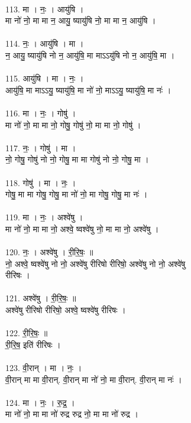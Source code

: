 \\
113. मा । नः॒ । आयु॑षि ।\\
मा नो॑ नो॒ मा मा न॒ आयु॒ ष्यायु॑षि नो॒ मा मा न॒ आयु॑षि ।\\
\\
114. नः॒ । आयु॑षि । मा ।\\
न॒ आयु॒ ष्यायु॑षि नो न॒ आयु॑षि॒ मा माऽऽयु॑षि नो न॒ आयु॑षि॒ मा ।\\
\\
115. आयु॑षि । मा । नः॒ ।\\
आयु॑षि॒ मा माऽऽयु॒ ष्यायु॑षि॒ मा नो॑ नो॒ माऽऽयु॒ ष्यायु॑षि॒ मा नः॑ ।\\
\\
116. मा । नः॒ । गोषु॑ ।\\
मा नो॑ नो॒ मा मा नो॒ गोषु॒ गोषु॑ नो॒ मा मा नो॒ गोषु॑ ।\\
\\
117. नः॒ । गोषु॑ । मा ।\\
नो॒ गोषु॒ गोषु॑ नो नो॒ गोषु॒ मा मा गोषु॑ नो नो॒ गोषु॒ मा ।\\
\\
118. गोषु॑ । मा । नः॒ ।\\
गोषु॒ मा मा गोषु॒ गोषु॒ मा नो॑ नो॒ मा गोषु॒ गोषु॒ मा नः॑ ।\\
\\
119. मा । नः॒ । अश्वे॑षु ।\\
मा नो॑ नो॒ मा मा नो॒ अश्वे॒ ष्वश्वे॑षु नो॒ मा मा नो॒ अश्वे॑षु ।\\
\\
120. नः॒ । अश्वे॑षु । री॒रि॒षः॒ ॥\\
नो॒ अश्वे॒ ष्वश्वे॑षु नो नो॒ अश्वे॑षु रीरिषो रीरिषो॒ अश्वे॑षु नो नो॒ अश्वे॑षु\\
रीरिषः ।\\
\\
121. अश्वे॑षु । री॒रि॒षः॒ ॥\\
अश्वे॑षु रीरिषो रीरिषो॒ अश्वे॒ ष्वश्वे॑षु रीरिषः ।\\
\\
122. री॒रि॒षः॒ ॥\\
री॒रि॒ष॒ इति॑ रीरिषः ।\\
\\
123. वी॒रान् । मा । नः॒ ।\\
वी॒रान् मा मा वी॒रान्. वी॒रान् मा नो॑ नो॒ मा वी॒रान्. वी॒रान् मा नः॑ ।\\
\\
124. मा । नः॒ । रु॒द्र॒ ।\\
मा नो॑ नो॒ मा मा नो॑ रुद्र रुद्र नो॒ मा मा नो॑ रुद्र ।\\
\\
